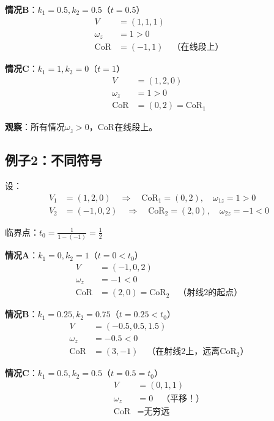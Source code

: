 \documentclass[12pt,a4paper]{article}
\begin{document}
\textbf{情况B}：$k_1 = 0.5, k_2 = 0.5$（$t = 0.5$）
\begin{align}
V &= (1, 1, 1) \\
\omega_z &= 1 > 0 \\
\text{CoR} &= (-1, 1) \quad \text{（在线段上）}
\end{align}

\textbf{情况C}：$k_1 = 1, k_2 = 0$（$t = 1$）
\begin{align}
V &= (1, 2, 0) \\
\omega_z &= 1 > 0 \\
\text{CoR} &= (0, 2) = \text{CoR}_1
\end{align}

\textbf{观察}：所有情况$\omega_z > 0$，CoR在线段上。

\subsection{例子2：不同符号}

设：
\begin{align}
V_1 &= (1, 2, 0) \quad \Rightarrow \quad \text{CoR}_1 = (0, 2), \quad \omega_{1z} = 1 > 0 \\
V_2 &= (-1, 0, 2) \quad \Rightarrow \quad \text{CoR}_2 = (2, 0), \quad \omega_{2z} = -1 < 0
\end{align}

临界点：$t_0 = \frac{1}{1 - (-1)} = \frac{1}{2}$

\textbf{情况A}：$k_1 = 0, k_2 = 1$（$t = 0 < t_0$）
\begin{align}
V &= (-1, 0, 2) \\
\omega_z &= -1 < 0 \\
\text{CoR} &= (2, 0) = \text{CoR}_2 \quad \text{（射线2的起点）}
\end{align}

\textbf{情况B}：$k_1 = 0.25, k_2 = 0.75$（$t = 0.25 < t_0$）
\begin{align}
V &= (-0.5, 0.5, 1.5) \\
\omega_z &= -0.5 < 0 \\
\text{CoR} &= (3, -1) \quad \text{（在射线2上，远离CoR$_2$）}
\end{align}

\textbf{情况C}：$k_1 = 0.5, k_2 = 0.5$（$t = 0.5 = t_0$）
\begin{align}
V &= (0, 1, 1) \\
\omega_z &= 0 \quad \text{（平移！）} \\
\text{CoR} &= \text{无穷远}
\end{align}
\end{document}
